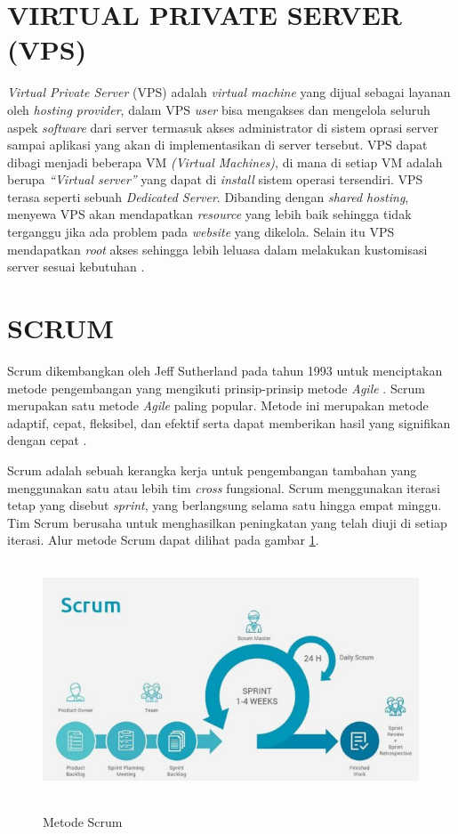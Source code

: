 \section{\uppercase{Virtual Private Server (VPS)}}
\textit{Virtual Private Server} (VPS) adalah \textit{virtual machine} yang dijual sebagai layanan oleh \textit{hosting provider}, dalam VPS \textit{user} bisa mengakses dan mengelola seluruh aspek \textit{software} dari server termasuk akses administrator di sistem oprasi server sampai aplikasi yang akan di implementasikan di server tersebut. VPS dapat dibagi menjadi beberapa VM \textit{(Virtual Machines)}, di mana di setiap VM adalah berupa \textit{“Virtual server”} yang dapat di \textit{install} sistem operasi tersendiri. VPS terasa seperti sebuah \textit{Dedicated Server}. Dibanding dengan \textit{shared hosting}, menyewa VPS akan mendapatkan \textit{resource} yang lebih baik sehingga tidak terganggu jika ada problem pada \textit{website} yang dikelola. Selain itu VPS mendapatkan \textit{root} akses sehingga lebih leluasa dalam melakukan kustomisasi server sesuai kebutuhan \citep{hamida2017analisis}.

\section{\uppercase{Scrum}}
Scrum dikembangkan oleh Jeff Sutherland pada tahun 1993 untuk menciptakan metode pengembangan yang mengikuti prinsip-prinsip metode \textit{Agile} \citep{fernando2018rancang}. Scrum merupakan satu metode \textit{Agile} paling popular. Metode ini merupakan metode adaptif, cepat, fleksibel, dan efektif serta dapat memberikan hasil yang signifikan dengan cepat \citep{hadinata2017implementasi}.

\par Scrum adalah sebuah kerangka kerja untuk pengembangan tambahan yang menggunakan satu atau lebih tim \textit{cross} fungsional. Scrum menggunakan iterasi tetap yang disebut \textit{sprint}, yang berlangsung selama satu hingga empat minggu. Tim Scrum berusaha untuk menghasilkan peningkatan yang telah diuji di setiap iterasi. Alur metode Scrum dapat dilihat pada gambar \ref{scrum}.

\begin{figure}[H]
\centering
{\includegraphics [width = 12.5cm, height= 7cm]{gambar/scrum}}
\caption{Metode Scrum \citep{wahyudi2018analisis}}
\label{scrum}
\end{figure}	

